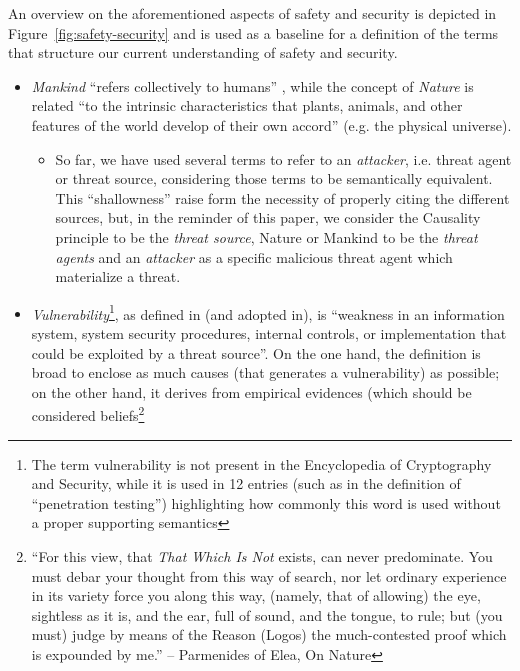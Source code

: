 An overview on the aforementioned aspects of safety and security is depicted in
Figure~\ref{fig:safety-security} and is used as a baseline for a definition of
the terms that structure our current understanding of safety and security. 
\begin{itemize}
	\item \emph{Mankind} ``refers collectively to humans''
\autocite{wiki-mankind}, while the concept of \emph{Nature} is
		related ``to the intrinsic characteristics that plants,
		animals, and other features of the world develop of their own
		accord'' (e.g. the physical universe)\autocite{wiki-nature}. 
		\begin{itemize}
			\item So far, we have used several terms to refer to an
				\emph{attacker}, i.e. threat agent or threat source,
				considering those terms to be semantically
				equivalent.  This ``shallowness'' raise form the
				necessity of properly citing the different sources, but,
				in the reminder of this paper, we consider the
				Causality principle to be the \emph{threat
				source}, Nature or Mankind to be the
				\emph{threat agents} and an \emph{attacker} as
				a specific malicious threat agent which materialize a
				threat.
		\end{itemize}
	\item \emph{Vulnerability}\footnote{The term vulnerability is not
		present in the Encyclopedia of Cryptography and Security, while
		it is used in 12 entries (such as in the definition of
		``penetration testing''\autocite{caddy2005pentest})
		highlighting how commonly this word is used without a proper
		supporting semantics}, as defined in\autocite{cnssi20104009}
		(and adopted in\autocite{nist2013800-53}), is ``weakness in an
		information system, system security procedures, internal
		controls, or implementation that could be exploited by a threat
		source''. On the one hand, the definition is broad to enclose
		as much causes (that generates a vulnerability) as possible; on
		the other hand, it derives from empirical evidences (which
		should be considered beliefs\footnote{``For this view, that
		\emph{That Which Is Not} exists, can never predominate. You
		must debar your thought from this way of search, nor let
		ordinary experience in its variety force you along this way,
		(namely, that of allowing) the eye, sightless as it is, and the
		ear, full of sound, and the tongue, to rule; but (you must)
		judge by means of the Reason (Logos) the much-contested proof
		which is expounded by me.'' -- Parmenides of Elea, On Nature
}
\end{itemize}
